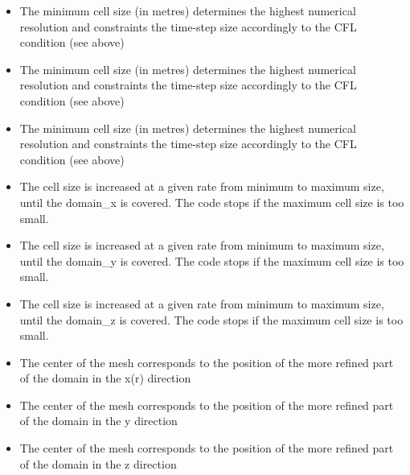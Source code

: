 \begin{itemize}
\item
{}
{The minimum cell size (in metres) determines the highest numerical resolution and constraints the time-step size accordingly to the CFL condition (see above)}

\item
{}
{The minimum cell size (in metres) determines the highest numerical resolution and constraints the time-step size accordingly to the CFL condition (see above)}

\item
{}
{The minimum cell size (in metres) determines the highest numerical resolution and constraints the time-step size accordingly to the CFL condition (see above)}

\item
{}
{The cell size is increased at a given rate from minimum to maximum size, until the domain\_x is covered. The code stops if the maximum cell size is too small.}

\item
{}
{The cell size is increased at a given rate from minimum to maximum size, until the domain\_y is covered. The code stops if the maximum cell size is too small.}

\item
{}
{The cell size is increased at a given rate from minimum to maximum size, until the domain\_z is covered. The code stops if the maximum cell size is too small.}

\item
{}
{The center of the mesh corresponds to the position of the more refined part of the domain in the x(r) direction}

\item
{}
{The center of the mesh corresponds to the position of the more refined part of the domain in the y direction}

\item
{}
{The center of the mesh corresponds to the position of the more refined part of the domain in the z direction}


\end{itemize}
